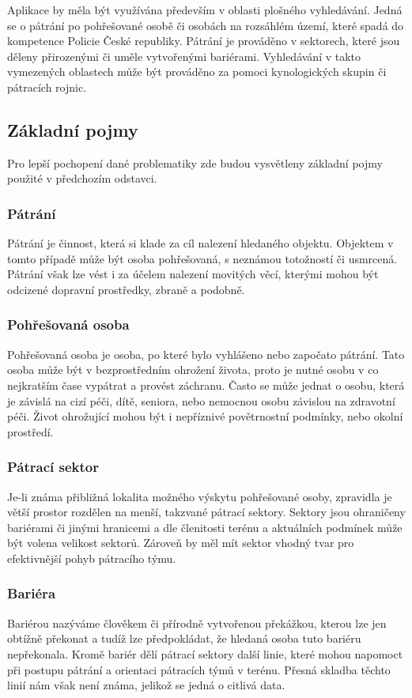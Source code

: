 	Aplikace by měla být využívána především v oblasti plošného vyhledávání. Jedná se o pátrání po pohřešované osobě či osobách na rozsáhlém území, které spadá do kompetence Policie České republiky. Pátrání je prováděno v sektorech, které jsou děleny přirozenými či uměle vytvořenými bariérami. Vyhledávání v takto vymezených oblastech může být prováděno za pomoci kynologických skupin či pátracích rojnic. 
	
\subsection{Základní pojmy}
	Pro lepší pochopení dané problematiky zde budou vysvětleny základní pojmy použité v předchozím odstavci.
	
\subsubsection{Pátrání}
	Pátrání je činnost, která si klade za cíl nalezení hledaného objektu. Objektem v tomto případě může být osoba pohřešovaná, s neznámou totožností či usmrcená. Pátrání však lze vést i za účelem nalezení movitých věcí, kterými mohou být odcizené dopravní prostředky, zbraně a podobně.

\subsubsection{Pohřešovaná osoba}
	Pohřešovaná osoba je osoba, po které bylo vyhlášeno nebo započato pátrání. Tato osoba může být v bezprostředním ohrožení života, proto je nutné osobu v co nej\-krat\-ším čase vypátrat a provést záchranu. Často se může jednat o osobu, která je závislá na cizí péči, dítě, seniora, nebo nemocnou osobu závislou na zdravotní péči. Život ohrožující mohou být i nepříznivé povětrnostní podmínky, nebo okolní prostředí.
	
\subsubsection{Pátrací sektor}
	Je-li známa přibližná lokalita možného výskytu pohřešované osoby, zpravidla je větší prostor rozdělen na menší, takzvané pátrací sektory. Sektory jsou ohraničeny ba\-ri\-é\-ra\-mi či jinými hranicemi a dle členitosti terénu a aktuálních podmínek může být volena velikost sektorů. Zároveň by měl mít sektor vhodný tvar pro efektivnější pohyb pátracího týmu.
	
\subsubsection{Bariéra}
	Bariérou nazýváme člověkem či přírodně vytvořenou překážkou, kterou lze jen obtížně překonat a tudíž lze předpokládat, že hledaná osoba tuto bariéru nepřekonala. Kromě bariér dělí pátrací sektory další linie, které mohou napomoct při postupu pátrání a orientaci pátracích týmů v terénu. Přesná skladba těchto linií nám však není známa, jelikož se jedná o citlivá data.